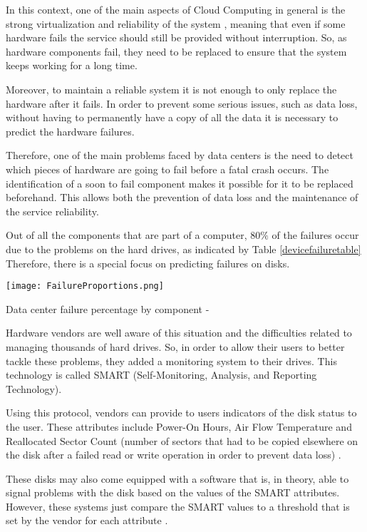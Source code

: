 In this context, one of the main aspects of Cloud Computing in general is the strong virtualization and reliability of the system \cite{Qian09}, meaning that even if some hardware fails the service should still be provided without interruption.
So, as hardware components fail, they need to be replaced to ensure that the system keeps working for a long time.

Moreover, to maintain a reliable system it is not enough to only replace the hardware after it fails.
In order to prevent some serious issues, such as data loss, without having to permanently have a copy of all the data it is necessary to predict the hardware failures.

Therefore, one of the main problems faced by data centers is the need to detect which pieces of hardware are going to fail before a fatal crash occurs.
The identification of a soon to fail component makes it possible for it to be replaced beforehand.
This allows both the prevention of data loss and the maintenance of the service reliability.

Out of all the components that are part of a computer, $80\%$ of the failures occur due to the problems on the hard drives, as indicated by Table \ref{devicefailuretable}
Therefore, there is a special focus on predicting failures on disks.

\begin{table}
    \begin{center}
      \texttt{[image: FailureProportions.png]}
      \caption[Failure percentage by component]{Data center failure percentage by component - \cite{Wang17}}
      \label{devicefailuretable}
    \end{center}
  \end{table}

Hardware vendors are well aware of this situation and the difficulties related to managing thousands of hard drives.
So, in order to allow their users to better tackle these problems, they added a monitoring system to their drives.
This technology is called SMART (Self-Monitoring, Analysis, and Reporting Technology).

Using this protocol, vendors can provide to users indicators of the disk status to the user.
These attributes include Power-On Hours, Air Flow Temperature and Reallocated Sector Count (number of sectors that had to be copied elsewhere on the disk after a failed read or write operation in order to prevent data loss) \cite{SamsungSSD}.

These disks may also come equipped with a software that is, in theory, able to signal problems with the disk based on the values of the SMART attributes.
However, these systems just compare the SMART values to a threshold that is set by the vendor for each attribute \cite{SamsungSSD}.

